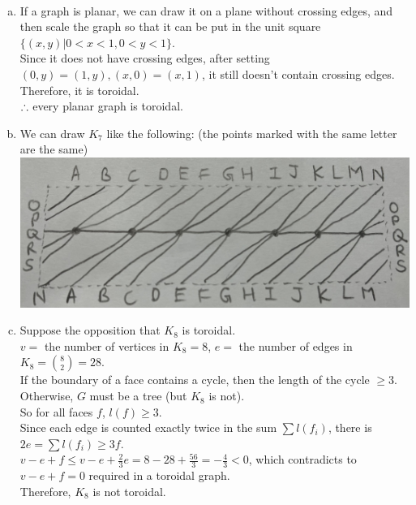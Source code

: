 \setcounter{pr}{4}
\begin{pr}$ $
\begin{enumerate}[(a)]
\item If a graph is planar, we can draw it on a plane without crossing edges, and then scale the graph so that it can be put in the unit square $\{(x, y)|0<x<1, 0<y<1\}$.\\
Since it does not have crossing edges, after setting $(0, y)=(1, y), (x, 0)=(x, 1)$, it still doesn't contain crossing edges. Therefore, it is toroidal.\\
$\therefore$ every planar graph is toroidal.
\item We can draw $K_7$ like the following: (the points marked with the same letter are the same)\\
\includegraphics[width=15cm]{K7.JPG}
\item Suppose the opposition that $K_8$ is toroidal.\\
$v=$ the number of vertices in $K_8=8$, $e=$ the number of edges in $K_8=\binom 82=28$.\\
If the boundary of a face contains a cycle, then the length of the cycle $\geq3$.\\
Otherwise, $G$ must be a tree (but $K_8$ is not).\\
So for all faces $f$, $l(f)\geq3$.\\
Since each edge is counted exactly twice in the sum $\sum l(f_i)$, there is $2e=\sum l(f_i)\geq3f$.\\
$v-e+f\leq v-e+\frac23e=8-28+\frac{56}3=-\frac43<0$, which contradicts to $v-e+f=0$ required in a toroidal graph.\\
Therefore, $K_8$ is not toroidal.
\end{enumerate}
\end{pr}
